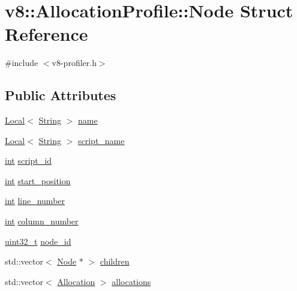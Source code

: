 \hypertarget{structv8_1_1AllocationProfile_1_1Node}{}\section{v8\+:\+:Allocation\+Profile\+:\+:Node Struct Reference}
\label{structv8_1_1AllocationProfile_1_1Node}


{\ttfamily \#include $<$v8-\/profiler.\+h$>$}

\subsection*{Public Attributes}
\begin{DoxyCompactItemize}
\item 
\mbox{\hyperlink{classv8_1_1Local}{Local}}$<$ \mbox{\hyperlink{classv8_1_1String}{String}} $>$ \mbox{\hyperlink{structv8_1_1AllocationProfile_1_1Node_af9f2c323d6a11e836c02e8ac88adc5a8}{name}}
\item 
\mbox{\hyperlink{classv8_1_1Local}{Local}}$<$ \mbox{\hyperlink{classv8_1_1String}{String}} $>$ \mbox{\hyperlink{structv8_1_1AllocationProfile_1_1Node_acd6567ac06a0bae713390559128e9c62}{script\+\_\+name}}
\item 
\mbox{\hyperlink{classint}{int}} \mbox{\hyperlink{structv8_1_1AllocationProfile_1_1Node_a4a746de878d9ad42b32fda4c365b98fb}{script\+\_\+id}}
\item 
\mbox{\hyperlink{classint}{int}} \mbox{\hyperlink{structv8_1_1AllocationProfile_1_1Node_a6caceefbf826a0425adc74331cc7a910}{start\+\_\+position}}
\item 
\mbox{\hyperlink{classint}{int}} \mbox{\hyperlink{structv8_1_1AllocationProfile_1_1Node_ac9773c92a3af3a9a9420337599e68bd9}{line\+\_\+number}}
\item 
\mbox{\hyperlink{classint}{int}} \mbox{\hyperlink{structv8_1_1AllocationProfile_1_1Node_a7cf86acc298428c858673fc1f9dbe305}{column\+\_\+number}}
\item 
\mbox{\hyperlink{classuint32__t}{uint32\+\_\+t}} \mbox{\hyperlink{structv8_1_1AllocationProfile_1_1Node_aa2a43ec43107692b2cfcb3b2b00aa801}{node\+\_\+id}}
\item 
std\+::vector$<$ \mbox{\hyperlink{structv8_1_1AllocationProfile_1_1Node}{Node}} $\ast$ $>$ \mbox{\hyperlink{structv8_1_1AllocationProfile_1_1Node_a176673c0440cb1baaf7713e14da84db0}{children}}
\item 
std\+::vector$<$ \mbox{\hyperlink{structv8_1_1AllocationProfile_1_1Allocation}{Allocation}} $>$ \mbox{\hyperlink{structv8_1_1AllocationProfile_1_1Node_a6ee0934b35ba77fb5d8b53f02d5a3068}{allocations}}
\end{DoxyCompactItemize}


